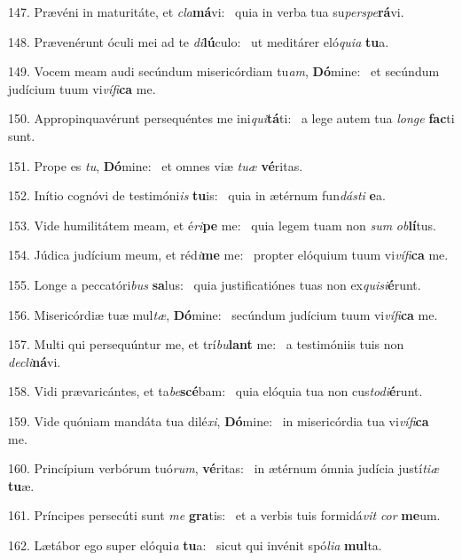 147. Prævéni in maturitáte, et \textit{cla}\textbf{má}vi: \ast\  quia in verba tua su\textit{per}\textit{spe}\textbf{rá}vi.\

148. Prævenérunt óculi mei ad te \textit{di}\textbf{lú}culo: \ast\  ut meditárer eló\textit{qui}\textit{a} \textbf{tu}a.\

149. Vocem meam audi secúndum misericórdiam tu\textit{am}, \textbf{Dó}mine: \ast\  et secúndum judícium tuum vi\textit{ví}\textit{fi}\textbf{ca} me.\

150. Appropinquavérunt persequéntes me ini\textit{qui}\textbf{tá}ti: \ast\  a lege autem tua \textit{lon}\textit{ge} \textbf{fac}ti sunt.\

151. Prope es \textit{tu}, \textbf{Dó}mine: \ast\  et omnes viæ \textit{tu}\textit{æ} \textbf{vé}ritas.\

152. Inítio cognóvi de testimóni\textit{is} \textbf{tu}is: \ast\  quia in ætérnum fun\textit{dás}\textit{ti} \textbf{e}a.\

153. Vide humilitátem meam, et é\textit{ri}\textbf{pe} me: \ast\  quia legem tuam non \textit{sum} \textit{ob}\textbf{lí}tus.\

154. Júdica judícium meum, et réd\textit{i}\textbf{me} me: \ast\  propter elóquium tuum vi\textit{ví}\textit{fi}\textbf{ca} me.\

155. Longe a peccatóri\textit{bus} \textbf{sa}lus: \ast\  quia justificatiónes tuas non ex\textit{qui}\textit{si}\textbf{é}runt.\

156. Misericórdiæ tuæ mul\textit{tæ}, \textbf{Dó}mine: \ast\  secúndum judícium tuum vi\textit{ví}\textit{fi}\textbf{ca} me.\

157. Multi qui persequúntur me, et trí\textit{bu}\textbf{lant} me: \ast\  a testimóniis tuis non \textit{de}\textit{cli}\textbf{ná}vi.\

158. Vidi prævaricántes, et ta\textit{be}\textbf{scé}bam: \ast\  quia elóquia tua non cus\textit{to}\textit{di}\textbf{é}runt.\

159. Vide quóniam mandáta tua dilé\textit{xi}, \textbf{Dó}mine: \ast\  in misericórdia tua vi\textit{ví}\textit{fi}\textbf{ca} me.\

160. Princípium verbórum tuó\textit{rum}, \textbf{vé}ritas: \ast\  in ætérnum ómnia judícia justí\textit{ti}\textit{æ} \textbf{tu}æ.\

161. Príncipes persecúti sunt \textit{me} \textbf{gra}tis: \ast\  et a verbis tuis formidá\textit{vit} \textit{cor} \textbf{me}um.\

162. Lætábor ego super elóqui\textit{a} \textbf{tu}a: \ast\  sicut qui invénit spó\textit{li}\textit{a} \textbf{mul}ta.\

